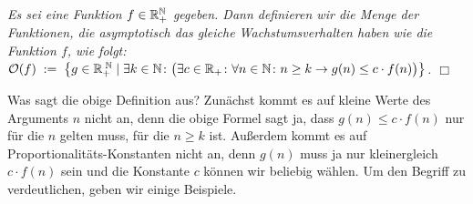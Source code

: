 \begin{Definition}[$\Oh(f)$] {\em
  Es sei eine Funktion $f\in {\mathbb R}_+^{\mathbb N}$ 
  gegeben.   Dann definieren wir die Menge der Funktionen, die asymptotisch
  das gleiche Wachstumsverhalten haben wie die Funktion $f$, wie folgt:
  \\[0.1cm]
  \hspace*{1.3cm} 
  $ \mathcal{O}(f) \;:=\; \left\{ g \in {\mathbb R}_+^{\;{\mathbb N}} \mid \exists k \in {\mathbb N} \colon 
    \bigl(\exists c \in {\mathbb R}_+\colon \forall n \in {\mathbb N} \colon n \geq k \rightarrow g(n) \leq c \cdot f(n)\bigr) \right\}$.
  \hspace*{\fill} $\Box$
}
\end{Definition}
Was sagt die obige Definition aus? Zun\"achst kommt es auf kleine Werte des Arguments $n$
nicht an, denn die obige Formel sagt ja, dass $g(n) \leq c \cdot f(n)$ nur f\"ur die $n$ gelten
muss, f\"ur die  $n \geq k$ ist.  Au{\ss}erdem kommt es auf Proportionalit\"ats-Konstanten nicht
an, denn $g(n)$ muss ja nur kleinergleich $c \cdot f(n)$ sein und die Konstante $c$ k\"onnen wir
beliebig w\"ahlen.  Um den Begriff zu verdeutlichen, geben wir einige Beispiele.
\vspace*{0.3cm}


